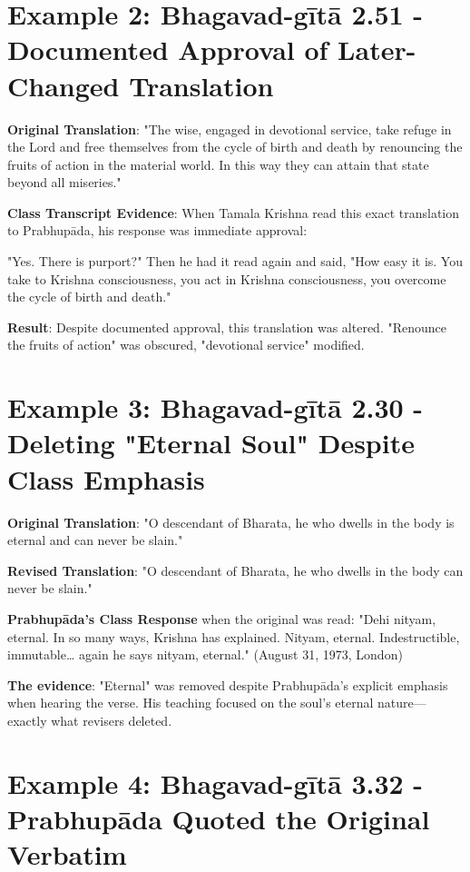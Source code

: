 \documentclass[11pt,twoside]{book}
\begin{document}
\vspace{-0.3cm}
\section*{Example 2: Bhagavad-gītā 2.51 - Documented Approval of Later-Changed Translation}
\label{sec:org7fd6f5d}

\textbf{\textbf{Original Translation}}: "The wise, engaged in devotional service, take refuge in the Lord and free themselves from the cycle of birth and death by renouncing the fruits of action in the material world. In this way they can attain that state beyond all miseries."

\textbf{\textbf{Class Transcript Evidence}}: When Tamala Krishna read this exact translation to Prabhupāda, his response was immediate approval:

"Yes. There is purport?" Then he had it read again and said, "How easy it is. You take to Krishna consciousness, you act in Krishna consciousness, you overcome the cycle of birth and death." 

\textbf{\textbf{Result}}: Despite documented approval, this translation was altered. "Renounce the fruits of action" was obscured, "devotional service" modified.

\vspace{-0.3cm}
\section*{Example 3: Bhagavad-gītā 2.30 - Deleting "Eternal Soul" Despite Class Emphasis}
\label{sec:orge3bf55f}

\textbf{\textbf{Original Translation}}: "O descendant of Bharata, he who dwells in the body is eternal and can never be slain."

\textbf{\textbf{Revised Translation}}: "O descendant of Bharata, he who dwells in the body can never be slain."

\textbf{\textbf{Prabhupāda's Class Response}} when the original was read:
"Dehi nityam, eternal. In so many ways, Krishna has explained. Nityam, eternal. Indestructible, immutable\ldots{} again he says nityam, eternal." (August 31, 1973, London)

\textbf{\textbf{The evidence}}: "Eternal" was removed despite Prabhupāda's explicit emphasis when hearing the verse. His teaching focused on the soul's eternal nature—exactly what revisers deleted.

\vspace{-0.3cm}
\section*{Example 4: Bhagavad-gītā 3.32 - Prabhupāda Quoted the Original Verbatim}
\label{sec:org6bc1287}
\end{document}

